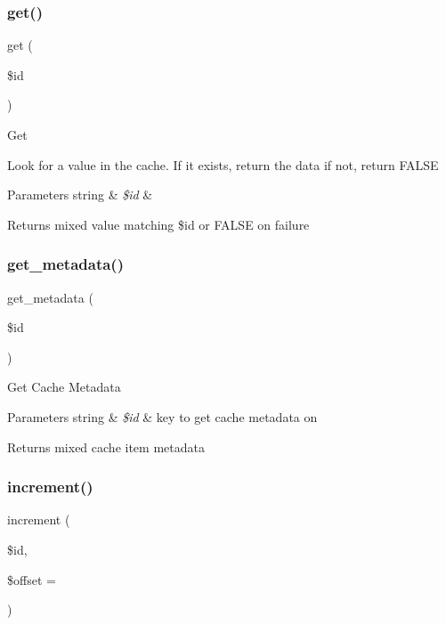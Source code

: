 \subsubsection{\texorpdfstring{get()}{get()}}
{\footnotesize\ttfamily get (\begin{DoxyParamCaption}\item[{}]{\$id }\end{DoxyParamCaption})}

Get

Look for a value in the cache. If it exists, return the data if not, return F\+A\+L\+SE


\begin{DoxyParams}[1]{Parameters}
string & {\em \$id} & \\
\hline
\end{DoxyParams}
\begin{DoxyReturn}{Returns}
mixed value matching \$id or F\+A\+L\+SE on failure 
\end{DoxyReturn}
\mbox{\label{class_c_i___cache_a59635cf18e997c5141bffa05ff7622e0}} 
\subsubsection{\texorpdfstring{get\+\_\+metadata()}{get\_metadata()}}
{\footnotesize\ttfamily get\+\_\+metadata (\begin{DoxyParamCaption}\item[{}]{\$id }\end{DoxyParamCaption})}

Get Cache Metadata


\begin{DoxyParams}[1]{Parameters}
string & {\em \$id} & key to get cache metadata on \\
\hline
\end{DoxyParams}
\begin{DoxyReturn}{Returns}
mixed cache item metadata 
\end{DoxyReturn}
\mbox{\label{class_c_i___cache_a2f07a4e09b57f4460d49852497d1808f}} 
\subsubsection{\texorpdfstring{increment()}{increment()}}
{\footnotesize\ttfamily increment (\begin{DoxyParamCaption}\item[{}]{\$id,  }\item[{}]{\$offset = {} }\end{DoxyParamCaption})}

